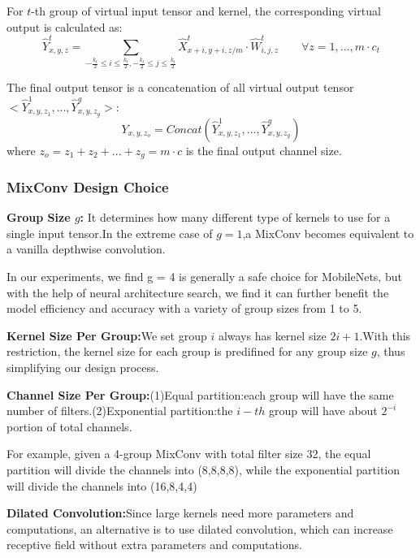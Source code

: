 \documentclass[11pt]{article}
\begin{document}
For $t$-th group of virtual input tensor and kernel, the corresponding virtual output is calculated as:
$$\hat{Y}_{x,y,z}^t = \sum_{-\frac{k_t}{2}\leq i \leq \frac{k_t}{2},-\frac{k_t}{2}\leq j \leq \frac{k_t}{2}}\hat{X}^t_{x+i,y+i,z/m}\cdot \hat{W}^t_{i,j,z} \qquad \forall z=1,...,m\cdot c_t$$

The final output tensor is a concatenation of all virtual output tensor $<\hat{Y}^1_{x,y,z_1},...,\hat{Y}^g_{x,y,z_g}>$:
$$Y_{x,y,z_o} = Concat(\hat{Y}^1_{x,y,z_1},...,\hat{Y}^g_{x,y,z_g})$$
where $z_o = z_1+z_2+...+z_g = m\cdot c$ is the final output channel size.

\subsubsection{MixConv Design Choice}
\textbf{Group Size $g$:} It determines how many different type of kernels to use for a single input tensor.In the extreme case of $g=1$,a MixConv becomes equivalent to a vanilla depthwise convolution.

In our experiments, we find g = 4 is generally a safe choice for MobileNets, but with the help of neural architecture search, we find it can further benefit the model efficiency and accuracy with a variety of group sizes from 1 to 5.

\textbf{Kernel Size Per Group:}We set group $i$ always has kernel size $2i+1$.With this restriction, the kernel size for each group is predifined for any group size $g$, thus simplifying our design process.

\textbf{Channel Size Per Group:}(1)Equal partition:each group will have the same number of filters.(2)Exponential partition:the $i-th$ group will have about $2^{-i}$ portion of total channels.

For example, given a 4-group MixConv with total filter size 32, the equal partition will divide the channels into (8,8,8,8), while the exponential partition will divide the channels into (16,8,4,4)

\textbf{Dilated Convolution:}Since large kernels need more parameters and computations, an alternative is to use dilated convolution, which can increase receptive field without extra parameters and computations.
\end{document}
